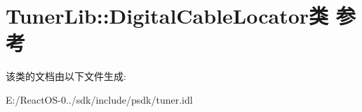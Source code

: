\hypertarget{class_tuner_lib_1_1_digital_cable_locator}{}\section{Tuner\+Lib\+:\+:Digital\+Cable\+Locator类 参考}
\label{class_tuner_lib_1_1_digital_cable_locator}


该类的文档由以下文件生成\+:\begin{DoxyCompactItemize}
\item 
E\+:/\+React\+O\+S-\/0../sdk/include/psdk/tuner.\+idl\end{DoxyCompactItemize}
